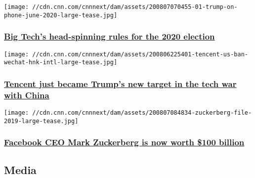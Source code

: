 \href{/2020/08/07/tech/big-tech-2020-election-analysis/index.html}{}

\texttt{[image: //cdn.cnn.com/cnnnext/dam/assets/200807070455-01-trump-on-phone-june-2020-large-tease.jpg]}

\hypertarget{big-techs-head-spinning-rules-for-the-2020-election}{%
\subsubsection{\texorpdfstring{\href{/2020/08/07/tech/big-tech-2020-election-analysis/index.html}{Big
Tech's head-spinning rules for the 2020
election}}{Big Tech's head-spinning rules for the 2020 election}}\label{big-techs-head-spinning-rules-for-the-2020-election}}

\href{/2020/08/07/tech/tencent-us-ban-wechat-hnk-intl/index.html}{}

\texttt{[image: //cdn.cnn.com/cnnnext/dam/assets/200806225401-tencent-us-ban-wechat-hnk-intl-large-tease.jpg]}

\hypertarget{tencent-just-became-trumps-new-target-in-the-tech-war-with-china}{%
\subsubsection{\texorpdfstring{\href{/2020/08/07/tech/tencent-us-ban-wechat-hnk-intl/index.html}{Tencent
just became Trump's new target in the tech war with
China}}{Tencent just became Trump's new target in the tech war with China}}\label{tencent-just-became-trumps-new-target-in-the-tech-war-with-china}}

\href{/2020/08/07/tech/mark-zuckerberg-net-worth-intl-hnk/index.html}{}

\texttt{[image: //cdn.cnn.com/cnnnext/dam/assets/200807084834-zuckerberg-file-2019-large-tease.jpg]}

\hypertarget{facebook-ceo-mark-zuckerberg-is-now-worth-100-billion}{%
\subsubsection{\texorpdfstring{\href{/2020/08/07/tech/mark-zuckerberg-net-worth-intl-hnk/index.html}{Facebook
CEO Mark Zuckerberg is now worth \$100
billion}}{Facebook CEO Mark Zuckerberg is now worth \$100 billion}}\label{facebook-ceo-mark-zuckerberg-is-now-worth-100-billion}}

\href{https://www.cnn.com/business/media}{}

\hypertarget{media}{%
\subsection{Media}\label{media}}

